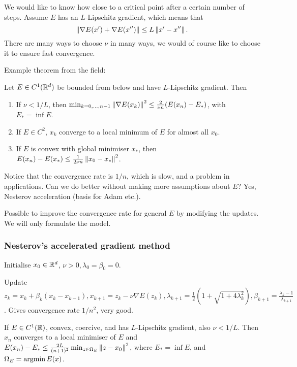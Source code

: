 \documentclass[12pt]{article}
\begin{document}
We would like to know how close to a critical point after a certain number of steps. Assume $E$ has an $L$-Lipschitz gradient, which means that
\begin{equation*}
    \left\lVert\nabla E(x') + \nabla E(x'')\right\rVert \leq L \left\lVert x'-x''\right\rVert.
\end{equation*}
There are many ways to choose $\nu$ in many ways, we would of course like to choose it to ensure fast convergence. 

Example theorem from the field:
\begin{theorem}
    Let $E\in C^1(\mathbb{R}^d)$ be bounded from below and have $L$-Lipschitz gradient. Then
    \begin{enumerate}[label=(\alph*)]
        \item If $\nu<1/L$, then $\min_{k=0,\dots,n-1} \left\lVert\nabla E(x_k)\right\rVert^2\leq \frac{2}{\nu n} (E(x_n)- E_*)$, with $E_* = \inf E$.
        \item If $E\in C^2$, $x_k$ converge to a local minimum of $E$ for almost all $x_0$.
        \item If $E$ is convex with global minimiser $x_*$, then $E(x_n)-E(x_*)\leq \frac{1}{2\nu n} \left\lVert x_0-x_*\right\rVert^2$.
    \end{enumerate}
\end{theorem}
Notice that the convergence rate is $1/n$, which is slow, and a problem in applications. Can we do better without making more assumptions about $E$? Yes, Nesterov acceleration (basis for Adam etc.). 

Possible to improve the convergence rate for general $E$ by modifying the updates. We will only formulate the model. 

\subsubsection{Nesterov's accelerated gradient method}
Initialise $x_0\in\mathbb{R}^d$, $\nu>0, \lambda_0=\beta_0=0$.

Update $z_k = x_k + \beta_k(x_k-x_{k-1}), x_{k+1} = z_k - \nu \nabla E(z_k), \lambda_{k+1} = \frac{1}{2}(1+\sqrt{1+4\lambda_k^2}), \beta_{k+1} = \frac{\lambda_{k}-1}{\lambda_{k+1}}$. Gives convergence rate $1/n^2$, very good.

\begin{theorem}
    If $E\in C^1(\mathbb{R})$, convex, coercive, and has $L$-Lipschitz gradient, also $\nu<1/L$. Then $x_n$ converges to a local minimiser of $E$ and $E(x_n)- E_* \leq \frac{2 L}{(n+1)^2}\min_{z\in\Omega_E}\left\lVert z-x_0\right\rVert^2$, where $E_*=\inf E$, and $\Omega_E = \operatorname{argmin} E(x)$. 
\end{theorem}
\end{document}
